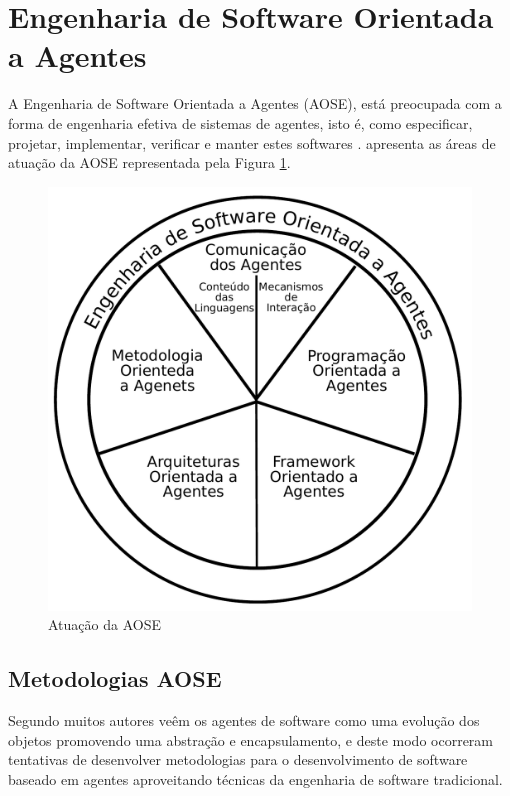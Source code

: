 \section{Engenharia de Software Orientada a Agentes}

A Engenharia de Software Orientada a Agentes (AOSE), está preocupada com a forma de engenharia efetiva de sistemas de agentes, isto é, como especificar, projetar, implementar, verificar e manter estes softwares \citep{winikoff2009future}. \citet{sturm2014agent} apresenta as áreas de atuação da AOSE representada pela Figura \ref{fig:aose_areas}.

\begin{figure}[ht]
\centering
\includegraphics[scale=0.45]{imagens/aose.pdf}
\caption{Atuação da AOSE}
\label{fig:aose_areas}
\end{figure}

\subsection{Metodologias AOSE}

Segundo \citep{padgham2016agent} muitos autores veêm os agentes de software como uma evolução dos objetos promovendo uma abstração e encapsulamento, e deste modo ocorreram tentativas de desenvolver metodologias para o desenvolvimento de software baseado em agentes aproveitando técnicas da engenharia de software tradicional. 


